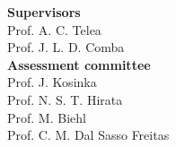 \newpage
\thispagestyle{empty}
{\large
\noindent\textbf{Supervisors}\\
Prof. A. C. Telea\\
Prof. J. L. D. Comba\\

\noindent\textbf{Assessment committee}\\
Prof. J. Kosinka\\
Prof. N. S. T. Hirata\\
Prof. M. Biehl\\
Prof. C. M. Dal Sasso Freitas\\

\vfill
}
